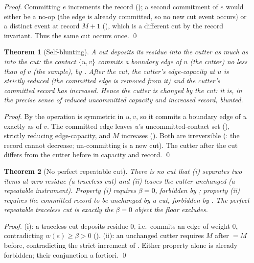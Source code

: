 \documentclass[11pt,a4paper]{article}
\theoremstyle{thmstyle}
\newtheorem{theorem}{Theorem}[section]
\theoremstyle{definition}
\theoremstyle{remark}
\newcommand{\wt}{w}
\newcommand{\flo}{\beta}                 %
\newcommand{\rec}{M}                     %
\begin{document}
\begin{proof}
Committing $e$ increments the record (); a second
commitment of $e$ would either be a no-op (the edge is already committed,
so no new cut event occurs) or a distinct event at record $\rec+1$
(), which is a different cut by the record invariant.
Thus the same cut occurs once. \qed
\end{proof}

\begin{theorem}[Self-blunting]
\label{thm:blunt}
A cut deposits its residue into the cutter as much as into the cut: the
contact $\{u,v\}$ commits a boundary edge of $u$ (the cutter) no less than
of $v$ (the sample), by . After the cut, the cutter's
edge-capacity at $u$ is strictly reduced (the committed edge is removed
from it) and the cutter's committed record has increased. Hence the cutter
is changed by the cut: it is, in the precise sense of reduced uncommitted
capacity and increased record, \emph{blunted}.
\end{theorem}

\begin{proof}
By  the operation is symmetric in $u,v$, so it commits a
boundary edge of $u$ exactly as of $v$. The committed edge leaves $u$'s
uncommitted-contact set (), strictly reducing
edge-capacity, and $\rec$ increases (). Both are
irreversible (: the record cannot decrease; un-committing
is a new cut). The cutter after the cut differs from the cutter before in
capacity and record. \qed
\end{proof}

\begin{theorem}[No perfect repeatable cut]
\label{thm:no-perfect}
There is no cut that (i) separates two items at zero residue (a traceless
cut) and (ii) leaves the cutter unchanged (a repeatable instrument).
Property (i) requires $\flo=0$, forbidden by ; property
(ii) requires the committed record to be unchanged by a cut, forbidden by
. The perfect repeatable traceless cut is exactly the
$\flo=0$ object the floor excludes.
\end{theorem}

\begin{proof}
(i): a traceless cut deposits residue $0$, i.e.\ commits an edge of weight
$0$, contradicting $\wt(e)\ge\flo>0$ (). (ii): an
unchanged cutter requires $\rec$ after $=\rec$ before, contradicting the
strict increment of . Either property alone is already
forbidden; their conjunction a fortiori. \qed
\end{proof}
\end{document}
